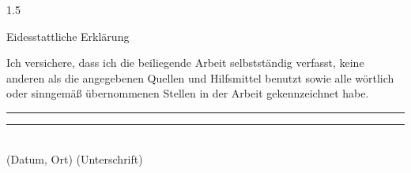 \documentclass[%
  draft=false,     %
  paper=a4,
  paper=portrait, %
  pagesize=auto, %
  fontsize=12pt,%
  version=last, %
  ngerman, %
  numbers=noenddot,
  listof=totoc,        %
  bibliography=totoc,  %
]{scrreprt} %
\newif\ifappendix{}
\newif\ifassignment{}
\begin{document}
\clearpage

\setcounter{romanPagenumber}{\value{page}} %



\begin{spacing}{1.5} %

  

  

  

  

\end{spacing}

\clearpage

\pagestyle{plain}


\ifappendix{}
  \appendix
  
  \clearpage
\fi


\setcounter{page}{\theromanPagenumber}
%
%
\printbibliography[title=\prefbiblioname]
\onehalfspacing{}
\clearpage

\pagestyle{empty}
\thispagestyle{empty}

\ifassignment{}
\else
  \begin{center}
    {\Large Eidesstattliche Erklärung}
    \vspace*{4cm}\end{center}
  \noindent
  Ich versichere, dass ich die beiliegende Arbeit selbstständig verfasst, keine anderen als die angegebenen Quellen und Hilfsmittel benutzt sowie alle wörtlich oder sinngemäß übernommenen Stellen in der Arbeit gekennzeichnet habe.
  \vspace{3cm}

  \rule[0.5ex]{6.5cm}{1pt}\hfill\rule[0.5ex]{6.5cm}{1pt}
  \\
  \hspace*{0.5cm} (Datum, Ort) \hfill (Unterschrift) 

  \clearpage
\end{document}
